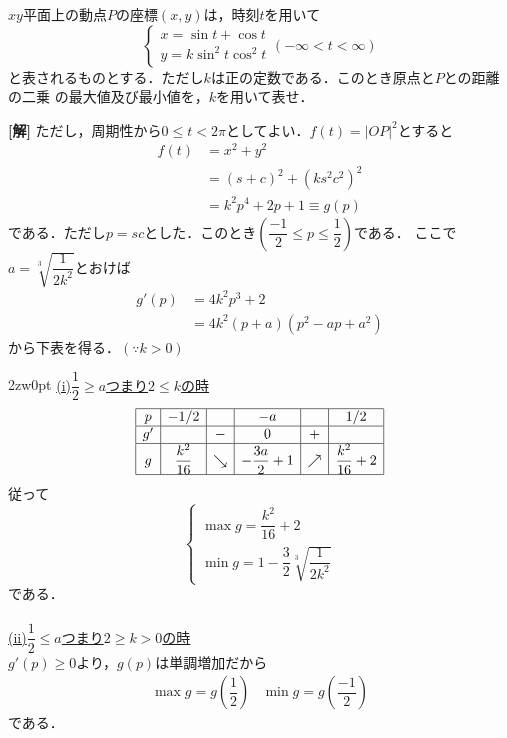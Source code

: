 \documentclass[a4j]{jarticle}
\begin{document}

     \begin{oframed}
     $xy$平面上の動点$P$の座標$(x,y)$は，時刻$t$を用いて
     \[\left\{
          \begin{array}{l}
          x=\sin t+\cos t  \\
          y=k\sin^2 t\cos^2 t
          \end{array}
     \right.(-\infty<t<\infty)\]
     と表されるものとする．ただし$k$は正の定数である．このとき原点と$P$との距離の二乗
     の最大値及び最小値を，$k$を用いて表せ．
     \end{oframed}

\setlength{\columnseprule}{0.4pt}
\begin{multicols}{2}
{\bf[解]}\2 ただし，周期性から$0\le t<2\pi$としてよい．$f(t)=|OP|^2$とすると
     \begin{align*}
     f(t)&=x^2+y^2 \\
     &=(s+c)^2+(ks^2c^2)^2 \\
     &=k^2p^4+2p+1\equiv g(p)
     \end{align*}
である．ただし$p=sc$とした．このとき$\left(\dfrac{-1}{2}\le p\le\dfrac{1}{2}\right)$である．
ここで$a=\sqrt[3]{\dfrac{1}{2k^2}}$とおけば
     \begin{align*}
     g'(p)&=4k^2p^3+2  \\
     &=4k^2(p+a)(p^2-ap+a^2)
     \end{align*}
から下表を得る．$(\because k>0)$ \\
     \begin{indentation}{2zw}{0pt}
     \noindent\underline{(i)$\dfrac{1}{2}\ge a$つまり$2\le k$の時} \\
          \[\begin{array}{|c|c|c|c|c|c|} \hline
          p & -1/2                  &     &-a                     &      &1/2                        \\ \hline
          g'&                         &  -  & 0                      &  +  &                             \\ \hline
          g &  \dfrac{k^2}{16}&\searrow&-\dfrac{3a}{2}+1&\nearrow &\dfrac{k^2}{16}+2  \\ \hline
          \end{array} \]    
    従って
          \[\left\{
               \begin{array}{l}
               \max g=\dfrac{k^2}{16}+2  \\
               \min g=1-\dfrac{3}{2}\sqrt[3]{\dfrac{1}{2k^2}}
               \end{array}
          \right.\]     
     である．
     \\ 
     \\
     \noindent\underline{(ii)$\dfrac{1}{2}\le a$つまり$2\ge k>0$の時} \\
     $g'(p)\ge0$より，$g(p)$は単調増加だから
          \[
               \begin{array}{ll}
               \max g=g\left(\dfrac{1}{2}\right) &  
               \min g=g\left(\dfrac{-1}{2}\right)
               \end{array}
          \]
     である．  \\   
     \end{indentation}
   

\end{multicols}
\end{document}
